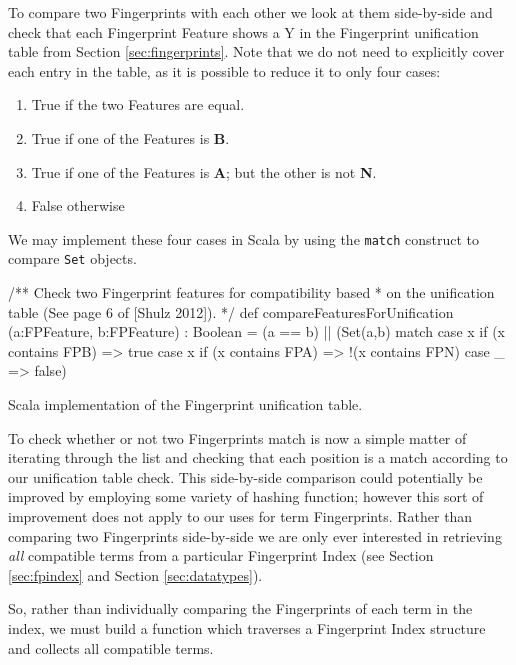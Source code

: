 To compare two Fingerprints with each other we look at them side-by-side and check
that each Fingerprint Feature shows a Y in the Fingerprint unification table from Section \ref{sec:fingerprints}.
Note that we do not need to explicitly cover each entry in the table, as it is possible
to reduce it to only four cases:
\begin{enumerate}
\item True if the two Features are equal.
\item True if one of the Features is \textbf{B}.
\item True if one of the Features is \textbf{A}; but the other is not \textbf{N}.
\item False otherwise 
\end{enumerate}
We may implement these four cases in Scala by using the \verb!match! construct
to compare \verb!Set! objects.
\begin{listing}[H]
\begin{scalacode}
 /** Check two Fingerprint features for compatibility based
   * on the unification table (See page 6 of [Shulz 2012]). */
  def compareFeaturesForUnification
         (a:FPFeature, b:FPFeature) : Boolean =
  (a == b) || 
  (Set(a,b) match {
    case x if (x contains FPB) => true
    case x if (x contains FPA) => !(x contains FPN)
    case _ => false})
\end{scalacode}
\caption{Scala implementation of the Fingerprint unification table. \protect\cite[p6]{shulz12}}
\label{lst:unitable}
\end{listing}

To check whether or not two Fingerprints match is now a simple matter of iterating
through the list and checking that each position is a match according to our unification
table check. This side-by-side comparison could potentially be improved by employing
some variety of hashing function; however this sort of improvement does not
apply to our uses for term Fingerprints. Rather than comparing two Fingerprints
side-by-side we are only ever interested in retrieving \emph{all} compatible
terms from a particular Fingerprint Index (see Section \ref{sec:fpindex}
and Section \ref{sec:datatypes}).

So, rather than individually comparing the Fingerprints of each term in the
index, we must build a function which traverses a Fingerprint Index structure
and collects all compatible terms.

